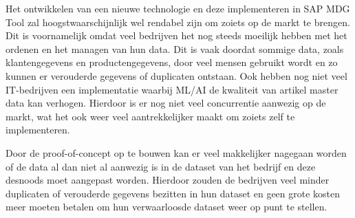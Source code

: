 Het ontwikkelen van een nieuwe technologie en deze implementeren in SAP MDG Tool zal hoogstwaarschijnlijk wel rendabel zijn om zoiets op de markt te brengen. Dit is voornamelijk omdat veel bedrijven het nog steeds moeilijk hebben met het ordenen en het managen van hun data. Dit is vaak doordat sommige data, zoals klantengegevens en productengegevens, door veel mensen gebruikt wordt en zo kunnen er verouderde gegevens of duplicaten ontstaan. Ook hebben nog niet veel IT-bedrijven een implementatie waarbij ML/AI de kwaliteit van artikel master data kan verhogen. Hierdoor is er nog niet veel concurrentie aanwezig op de markt, wat het ook weer veel aantrekkelijker maakt om zoiets zelf te implementeren. 

Door de proof-of-concept op te bouwen kan er veel makkelijker nagegaan worden of de data al dan niet al aanwezig is in de dataset van het bedrijf en deze desnoods moet aangepast worden. Hierdoor zouden de bedrijven veel minder duplicaten of verouderde gegevens bezitten in hun dataset en geen grote kosten meer moeten betalen om hun verwaarloosde dataset weer op punt te stellen. 

